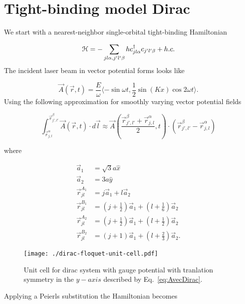 \section{Tight-binding model Dirac}

We start with a nearest-neighbor single-orbital tight-binding Hamiltonian

\begin{equation}
  \mathcal{H} = - \sum_{jl\alpha,j'l'\beta} h c^{\dagger}_{jl\alpha} c_{j'l'\beta} + h.c.
\end{equation}
The incident laser beam in vector potential forms looks like

\begin{equation} \label{eq:AvecDirac}
  \vec{A}(\vec{r},t) = \dfrac{E}{\omega} \langle -\sin \omega t, \dfrac{1}{2} \sin(Kx) \cos 2\omega t \rangle.
\end{equation}
Using the following approximation for smoothly varying vector potential fields

\begin{equation}
  \int_{\vec{r}_{j,l}^{\alpha}} ^{\vec{r}_{j',l'}^{\beta}} \vec{A}(\vec{r},t) \cdot d\vec{l} \approx \vec{A} \left( \dfrac{ \vec{r}_{j',l'}^{\beta} + \vec{r}_{j,l}^{\alpha} }{2}, t \right) \cdot \left( \vec{r}_{j',l'}^{\beta} - \vec{r}_{j,l}^{\alpha} \right)
\end{equation}


where

\begin{align}
  \vec{a}_1 &= \sqrt{3}a\hat{x} \\
  \vec{a}_2 &= 3a\hat{y} \\
  \vec{r}_{jl}^{A_1} &= j\vec{a}_1 + l\vec{a}_2 \\
  \vec{r}_{jl}^{B_1} &= (j+\tfrac{1}{2})\vec{a}_1 + (l+\tfrac{1}{6})\vec{a}_2 \\
  \vec{r}_{jl}^{A_2} &= (j+\tfrac{1}{2})\vec{a}_1 + (l+\tfrac{1}{2})\vec{a}_2 \\
  \vec{r}_{jl}^{B_2} &= (j+1)\vec{a}_1 + (l+\tfrac{2}{3})\vec{a}_2.
\end{align}

\begin{figure}[h]
  \texttt{[image: ./dirac-floquet-unit-cell.pdf]}
\caption{Unit cell for dirac system with gauge potential with tranlation symmetry in the $y-axis$ described by Eq.~\eqref{eq:AvecDirac}.}
  \label{fig:dirac-floquet-unit-cell}
\end{figure}
Applying a Peierls substitution the Hamiltonian becomes

